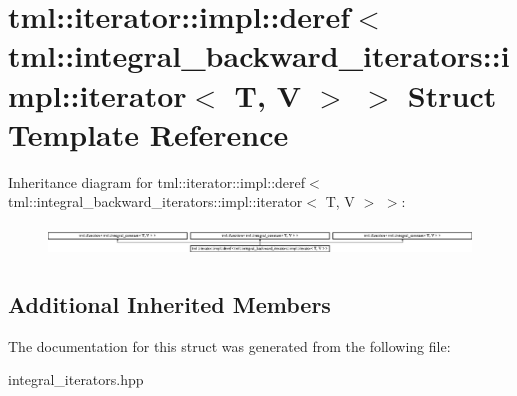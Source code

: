 \hypertarget{structtml_1_1iterator_1_1impl_1_1deref_3_01tml_1_1integral__backward__iterators_1_1impl_1_1iterator_3_01T_00_01V_01_4_01_4}{\section{tml\+:\+:iterator\+:\+:impl\+:\+:deref$<$ tml\+:\+:integral\+\_\+backward\+\_\+iterators\+:\+:impl\+:\+:iterator$<$ T, V $>$ $>$ Struct Template Reference}
\label{structtml_1_1iterator_1_1impl_1_1deref_3_01tml_1_1integral__backward__iterators_1_1impl_1_1iterator_3_01T_00_01V_01_4_01_4}
}
Inheritance diagram for tml\+:\+:iterator\+:\+:impl\+:\+:deref$<$ tml\+:\+:integral\+\_\+backward\+\_\+iterators\+:\+:impl\+:\+:iterator$<$ T, V $>$ $>$\+:\begin{figure}[H]
\begin{center}
\leavevmode
\includegraphics[height=0.794326cm]{structtml_1_1iterator_1_1impl_1_1deref_3_01tml_1_1integral__backward__iterators_1_1impl_1_1iterator_3_01T_00_01V_01_4_01_4}
\end{center}
\end{figure}
\subsection*{Additional Inherited Members}


The documentation for this struct was generated from the following file\+:\begin{DoxyCompactItemize}
\item 
integral\+\_\+iterators.\+hpp\end{DoxyCompactItemize}

